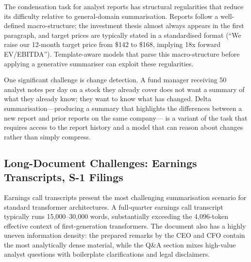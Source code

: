 The condensation task for analyst reports has structural regularities that reduce its
difficulty relative to general-domain summarisation. Reports follow a well-defined
macro-structure; the investment thesis almost always appears in the first paragraph,
and target prices are typically stated in a standardised format (``We raise our 12-month
target price from \$142 to \$168, implying 18x forward EV/EBITDA''). Template-aware
models that parse this macro-structure before applying a generative summariser can
exploit these regularities.

One significant challenge is change detection. A fund manager receiving 50 analyst notes
per day on a stock they already cover does not want a summary of what they already know;
they want to know what has changed. Delta summarisation---producing a summary that
highlights the differences between a new report and prior reports on the same company---
is a variant of the task that requires access to the report history and a model that
can reason about changes rather than simply compress.

\subsection{Long-Document Challenges: Earnings Transcripts, S-1 Filings}
\label{sec:ch14-long-document-challenges}

Earnings call transcripts present the most challenging summarisation scenario for
standard transformer architectures. A full-quarter earnings call transcript typically
runs 15,000--30,000 words, substantially exceeding the 4,096-token effective context of
first-generation transformers. The document also has a highly uneven information density:
the prepared remarks by the CEO and CFO contain the most analytically dense material,
while the Q\&A section mixes high-value analyst questions with boilerplate clarifications
and legal disclaimers.

